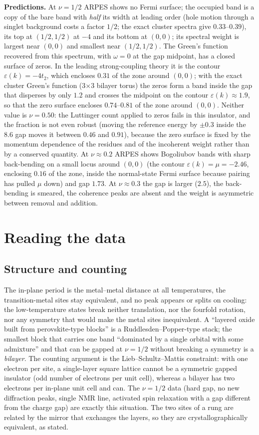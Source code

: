 \documentclass[11pt]{article}
\newcommand{\nuh}{\nu=1/2}
\newcommand{\nut}{\nu\approx0.3}
\newcommand{\nutw}{\nu\approx0.2}
\begin{document}
\textbf{Predictions.} At $\nuh$ ARPES shows no Fermi surface; the occupied band is a copy of the bare band with \emph{half} its width at leading order (hole motion through a singlet background costs a factor $1/2$; the exact cluster spectra give $0.33$--$0.39$), its top at $(1/2,1/2)$ at $-4$ and its bottom at $(0,0)$; its spectral weight is largest near $(0,0)$ and smallest near $(1/2,1/2)$. The Green's function recovered from this spectrum, with $\omega=0$ at the gap midpoint, has a closed surface of zeros. In the leading strong-coupling theory it is the contour $\varepsilon(k)=-4t_2$, which encloses $0.31$ of the zone around $(0,0)$; with the exact cluster Green's function (3$\times$3 bilayer torus) the zeros form a band inside the gap that disperses by only $1.2$ and crosses the midpoint on the contour $\varepsilon(k)\approx1.9$, so that the zero surface encloses $0.74$--$0.81$ of the zone around $(0,0)$. Neither value is $\nu=0.50$: the Luttinger count applied to zeros fails in this insulator, and the fraction is not even robust (moving the reference energy by $\pm0.3$ inside the $8.6$ gap moves it between $0.46$ and $0.91$), because the zero surface is fixed by the momentum dependence of the residues and of the incoherent weight rather than by a conserved quantity. At $\nutw$ ARPES shows Bogoliubov bands with sharp back-bending on a small locus around $(0,0)$ (the contour $\varepsilon(k)=\mu=-2.46$, enclosing $0.16$ of the zone, inside the normal-state Fermi surface because pairing has pulled $\mu$ down) and gap $1.73$. At $\nut$ the gap is larger ($2.5$), the back-bending is smeared, the coherence peaks are absent and the weight is asymmetric between removal and addition.

\section{Reading the data}

\subsection{Structure and counting}
The in-plane period is the metal--metal distance at all temperatures, the transition-metal sites stay equivalent, and no peak appears or splits on cooling: the low-temperature states break neither translation, nor the fourfold rotation, nor any symmetry that would make the metal sites inequivalent. A ``layered oxide built from perovskite-type blocks'' is a Ruddlesden--Popper-type stack; the smallest block that carries one band ``dominated by a single orbital with some admixture'' and that can be gapped at $\nuh$ without breaking a symmetry is a \emph{bilayer}. The counting argument is the Lieb--Schultz--Mattis constraint: with one electron per site, a single-layer square lattice cannot be a symmetric gapped insulator (odd number of electrons per unit cell), whereas a bilayer has two electrons per in-plane unit cell and can. The $\nuh$ data (hard gap, no new diffraction peaks, single NMR line, activated spin relaxation with a gap different from the charge gap) are exactly this situation. The two sites of a rung are related by the mirror that exchanges the layers, so they are crystallographically equivalent, as stated.
\end{document}
